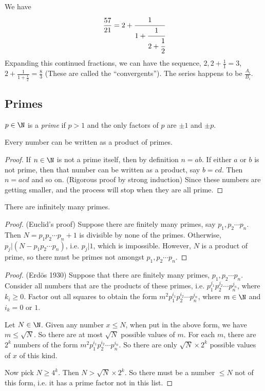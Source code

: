 \documentclass[a4paper]{article}
\begin{document}
  We have 
  \[
    \frac{57}{21} = 2 + \cfrac{1}{1 + \cfrac{1}{2 + \cfrac{1}{2}}}
  \]
  Expanding this continued fractions, we can have the sequence, $2, 2 + \frac{1}{1} = 3$, $2 + \frac{1}{1 + \frac{1}{2}} = \frac{8}{3}$ (These are called the ``convergents''). The series happens to be $\frac{A_i}{B_i}$.

  \subsection{Primes}
  \begin{defi}
    $p\in \N$ is a \emph{prime} if $p > 1$ and the only factors of $p$ are $\pm 1$ and $\pm p$.
  \end{defi}

  \begin{thm}
    Every number can be written as a product of primes.
  \end{thm}

  \begin{proof}
    If $n\in \N$ is not a prime itself, then by definition $n = ab$. If either $a$ or $b$ is not prime, then that number can be written as a product, say $b = cd$. Then $n = acd$ and so on. (Rigorous proof by strong induction) Since these numbers are getting smaller, and the process will stop when they are all prime.
  \end{proof}

  \begin{thm}
    There are infinitely many primes.
  \end{thm}

  \begin{proof}
    (Euclid's proof) Suppose there are finitely many primes, say $p_1, p_2 \cdots p_n$. Then $N = p_1p_2\cdots p_n + 1$ is divisible by none of the primes.  Otherwise, $p_j|(N - p_1p_2\cdots p_n)$, i.e. $p_j|1$, which is impossible. However, $N$ is a product of prime, so there must be primes not amongst $p_1, p_2\cdots p_n$.
  \end{proof}

  \begin{proof}
    (Erd\"{o}s 1930) Suppose that there are finitely many primes, $p_1, p_2\cdots p_n$. Consider all numbers that are the products of these primes, i.e. $p_1^{j_1}p_2^{j_2}\cdots p_n^{j_n}$, where $k_i \geq 0$. Factor out all squares to obtain the form $m^2p_1^{i_1}p_2^{i_2}\cdots p_n^{i_n}$, where $m\in \N$ and $i_k = 0$ or $1$.

    Let $N\in\N$. Given any number $x \leq N$, when put in the above form, we have $m \leq \sqrt{N}$. So there are at most $\sqrt{N}$ possible values of $m$. For each $m$, there are $2^k$ numbers of the form $m^2p_1^{i_1}p_2^{i_2}\cdots p_n^{i_n}$. So there are only $\sqrt{N}\times 2^k$ possible values of $x$ of this kind.

    Now pick $N\geq 4^k$. Then $N > \sqrt{N}\times 2^k$. So there must be a number $\leq N$ not of this form, i.e. it has a prime factor not in this list.
  \end{proof}
\end{document}
